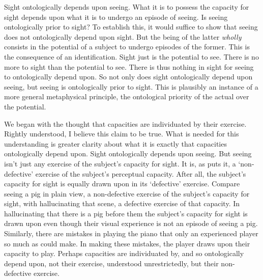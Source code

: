 \documentclass[12pt]{article}
\begin{document}
Sight ontologically depends upon seeing. What it is to possess the capacity for sight depends upon what it is to undergo an episode of seeing. Is seeing ontologically prior to sight? To establish this, it would suffice to show that seeing does not ontologically depend upon sight. But the being of the latter \emph{wholly} consists in the potential of a subject to undergo episodes of the former. This is the consequence of an identification. Sight just is the potential to see. There is no more to sight than the potential to see. There is thus nothing in sight for seeing to ontologically depend upon. So not only does sight ontologically depend upon seeing, but seeing is ontologically prior to sight. This is plausibly an instance of a more general metaphysical principle, the ontological priority of the actual over the potential.

We began with the thought that capacities are individuated by their exercise. Rightly understood, I believe this claim to be true. What is needed for this understanding is greater clarity about what it is exactly that capacities ontologically depend upon. Sight ontologically depends upon seeing. But seeing isn't just any exercise of the subject's capacity for sight. It is, as \citet{McDowell:2010fk} puts it, a `non-defective' exercise of the subject's perceptual capacity. After all, the subject's capacity for sight is equally drawn upon in its `defective' exercise. Compare seeing a pig in plain view, a non-defective exercise of the subject's capacity for sight, with hallucinating that scene, a defective exercise of that capacity. In hallucinating that there is a pig before them the subject's capacity for sight is drawn upon even though their visual experience is not an episode of seeing a pig. Similarly, there are mistakes in playing the piano that only an experienced player so much as could make. In making these mistakes, the player draws upon their capacity to play. Perhaps capacities are individuated by, and so ontologically depend upon, not their exercise, understood unrestrictedly, but their non-defective exercise.
\end{document}
